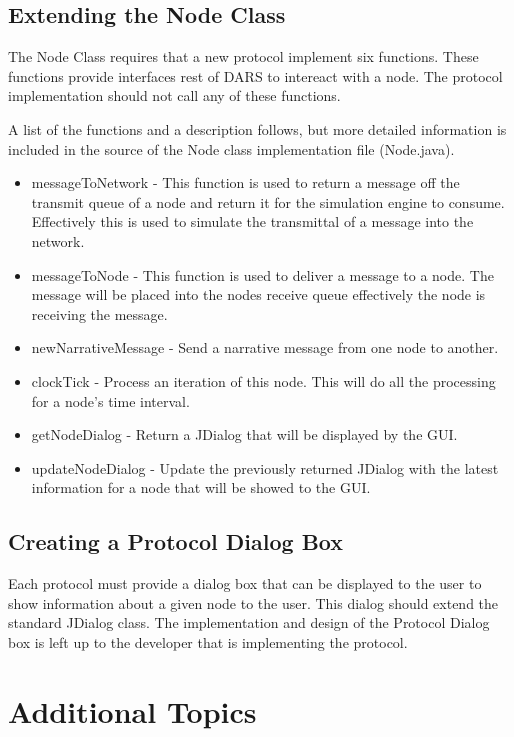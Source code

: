 \documentclass[a4paper,11pt,titlepage]{article}
\begin{document}
\subsection{Extending the Node Class}
The Node Class requires that a new protocol implement six functions. These functions provide interfaces rest of DARS to intereact with a node. The protocol implementation should not call any of these functions.

A list of the functions and a description follows, but more detailed information is included in the source of the Node class implementation file (Node.java).

\begin{itemize}
   \item messageToNetwork - This function is used to return a message off the transmit queue of a node and return it for the simulation engine to consume. Effectively this is used to simulate the transmittal of a message into the network.
   \item messageToNode - This function is used to deliver a message to a node. The message will be placed into the nodes receive queue effectively the node is receiving the message.
   \item newNarrativeMessage - Send a narrative message from one node to another.
   \item clockTick - Process an iteration of this node. This will do all the processing for a node's time interval.
   \item getNodeDialog - Return a JDialog that will be displayed by the GUI.
   \item updateNodeDialog - Update the previously returned JDialog with the latest information for a node that will be showed to the GUI.
\end{itemize}

\subsection{Creating a Protocol Dialog Box}
Each protocol must provide a dialog box that can be displayed to the user to show information about a given node to the user. This dialog should extend the standard JDialog class. The implementation and design of the Protocol Dialog box is left up to the developer that is implementing the protocol.

\section{Additional Topics}
\end{document}
